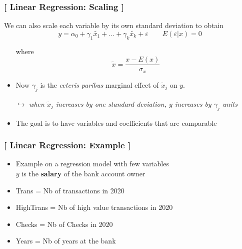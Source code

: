 \documentclass[xcolor=x11names,compress]{beamer}
\renewcommand{\(}{\begin{columns}}
\renewcommand{\)}{\end{columns}}
\newcommand{\<}[1]{\begin{column}{#1}}
\renewcommand{\>}{\end{column}}
\begin{document}
\begin{frame} %
\frametitle{\textcolor{brique}{[ Linear Regression: Scaling ]}}

We can also scale each variable by its own standard deviation to obtain
$$
y = \alpha_0 + \gamma_1 \tilde{x_1} + \ldots + \gamma_{k} \tilde{x_k}  + \varepsilon \qquad E (\varepsilon|x)  = 0
$$
\pause
\begin{itemize}[<+->]
  \item[] where $$\tilde{x} = \frac{x-E(x)}{\sigma_x} $$
  \item Now $\gamma_j$ is the \textit{ceteris paribus} marginal effect of $\tilde{x}_j$ on $y$.
   \item[$\hookrightarrow$] \textit{when  $\tilde{x}_j$ increases by one standard deviation,  $y$ increases by $\gamma_j$ units}
  \item The goal is to have variables and coefficients that are comparable
\end{itemize}
\end{frame}


\begin{frame} %
\frametitle{\textcolor{brique}{[ Linear Regression: Example ]}}
\pause
\begin{itemize}
\item Example on a regression model with few variables\\
$y$ is the \textbf{salary} of the bank account owner
 \item Trans = Nb of transactions in 2020
 \item HighTrans = Nb of high value transactions in 2020
 \item Checks = Nb of Checks in 2020
 \item Years = Nb of years at the bank
\end{itemize}
\end{frame}
\end{document}
